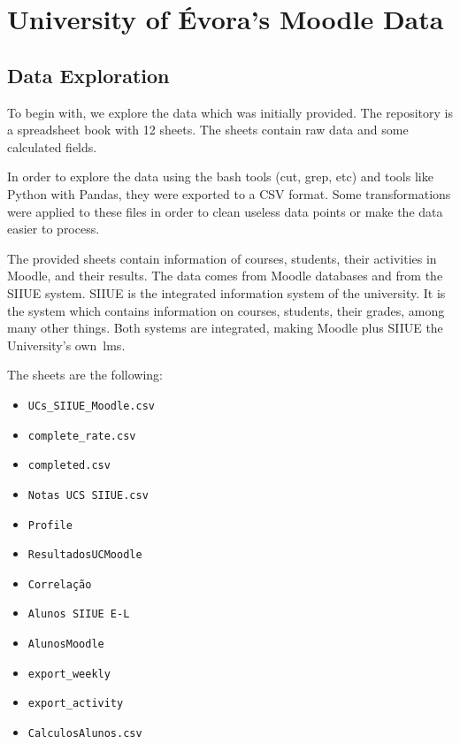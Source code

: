 \chapter{University of Évora's Moodle Data}
\label{sec:data}

\section{Data Exploration}

To begin with, we explore the data which was initially provided. The repository
is a spreadsheet book with 12 sheets. The sheets contain raw data and some
calculated fields.

In order to explore the data using the bash tools (cut, grep, etc) and tools
like Python with Pandas, they were exported to a CSV format. Some
transformations were applied to these files in order to clean useless data
points or make the data easier to process.

The provided sheets contain information of courses, students, their activities
in Moodle, and their results. The data comes from Moodle databases and from the
SIIUE system. SIIUE is the integrated information system of the university. It
is the system which contains information on courses, students, their grades,
among many other things. Both systems are integrated, making Moodle plus SIIUE
the University's own~\gls{lms}.

The sheets are the following:

\begin{itemize}
    \item \texttt{UCs\_SIIUE\_Moodle.csv}
    \item \texttt{complete\_rate.csv}
    \item \texttt{completed.csv}
    \item \texttt{Notas UCS SIIUE.csv}
    \item \texttt{Profile}
    \item \texttt{ResultadosUCMoodle}
    \item \texttt{Correlação}
    \item \texttt{Alunos SIIUE E-L}
    \item \texttt{AlunosMoodle}
    \item \texttt{export\_weekly}
    \item \texttt{export\_activity}
    \item \texttt{CalculosAlunos.csv}
\end{itemize}

